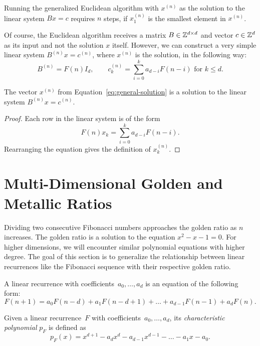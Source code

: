 \begin{corollary}
  Running the generalized Euclidean algorithm with $x^{(n)}$ as the solution to
  the linear system $B x = c$ requires $n$ steps, if $x^{(n)}_1$ is the
  smallest element in $x^{(n)}$.
\end{corollary}

Of course, the Euclidean algorithm receives a matrix $B \in {\mathbb Z}^{d \times d}$
and vector $c \in {\mathbb Z}^d$ as its input and not the solution $x$ itself.
However, we can construct a very simple linear system $B^{(n)} x = c^{(n)}$,
where $x^{(n)}$ is the solution, in the following way:
\[
  B^{(n)} = F(n) I_d, \qquad c^{(n)}_k = \sum_{i=0}^k a_{d-i} F(n - i) \text{ for } k ≤ d.
\]

\begin{lemma}
  The vector $x^{(n)}$ from Equation~\ref{eq:general-solution} is a solution to the
  linear system $B^{(n)} x = c^{(n)}$.
\end{lemma}

\begin{proof}
  Each row in the linear system is of the form
  \[
    F(n) x_k = \sum_{i = 0}^k a_{d-i} F(n - i).
  \]
  Rearranging the equation gives the definition of $x^{(n)}_k$.
\end{proof}

\section{Multi-Dimensional Golden and Metallic Ratios}

Dividing two consecutive Fibonacci numbers approaches the golden ratio as $n$ increases.
The golden ratio is a solution to the equation $x^2 - x - 1 = 0$.
For higher dimensions, we will encounter similar polynomial equations with higher degree.
The goal of this section is to generalize the relationship between linear
recurrences like the Fibonacci sequence with their respective golden ratio.

\begin{definition}
  A linear recurrence with coefficients~$a_0, \dots, a_d$ is an equation of the
  following form:
  \[
    F(n + 1) = a_0 F(n - d) + a_1 F(n - d + 1) + \dots + a_{d-1} F(n - 1) + a_d F(n).
  \]
\end{definition}

\begin{definition}
  Given a linear recurrence~$F$ with coefficients~$a_0, \dots, a_d$, its
  \emph{characteristic polynomial} $p_F$ is defined as
  \[
    p_F(x) = x^{d+1} - a_d x^d - a_{d-1} x^{d-1} - \dots - a_1 x - a_0.
  \]
\end{definition}

